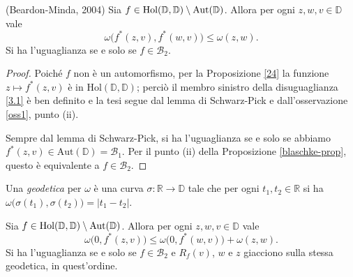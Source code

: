 \begin{thm} \label{31}
  (Beardon-Minda, 2004) Sia $f \in \text{\normalfont{Hol}}(\mathbb{D},\mathbb{D})\setminus\text{\normalfont{Aut}}(\mathbb{D})$. Allora per ogni $z, w, v \in \mathbb{D}$ vale
  \begin{equation} \label{3.1}
    \omega\bigl(f^*(z,v),f^*(w,v)\bigr) \le \omega(z,w).
  \end{equation}
  Si ha l'uguaglianza se e solo se $f \in \mathcal{B}_2$.
\end{thm}

\begin{proof}
  Poiché $f$ non è un automorfismo, per la Proposizione \ref{24} la funzione $z \longmapsto f^*(z,v)$ è in $\text{Hol}(\mathbb{D}, \mathbb{D})$; perciò il membro sinistro della disuguaglianza \eqref{3.1} è ben definito e la tesi segue dal lemma di Schwarz-Pick e dall'osservazione \ref{oss1}, punto (ii).

  Sempre dal lemma di Schwarz-Pick, si ha l'uguaglianza se e solo se abbiamo $f^*(z,v) \in \text{Aut}(\mathbb{D})=\mathcal{B}_1$. Per il punto (ii) della Proposizione \ref{blaschke-prop}, questo è equivalente a $f \in \mathcal{B}_2$.
\end{proof}

\begin{defn}
  Una \textit{geodetica} per $\omega$ è una curva $\sigma: \mathbb{R} \longrightarrow \mathbb{D}$ tale che per ogni $t_1,t_2 \in \mathbb{R}$ si ha $\omega\bigl(\sigma(t_1),\sigma(t_2)\bigr)=|t_1-t_2|$.
\end{defn}

\begin{cor} \label{32}
  Sia $f \in \text{\normalfont{Hol}}(\mathbb{D},\mathbb{D})\setminus\text{\normalfont{Aut}}(\mathbb{D})$. Allora per ogni $z, w, v \in \mathbb{D}$ vale
  \begin{equation}
    \omega\bigl(0, f^*(z,v)\bigr) \le \omega\bigl(0,f^*(w,v)\bigr)+\omega(z,w).
  \end{equation}
  Si ha l'uguaglianza se e solo se $f \in \mathcal{B}_2$ e $R_f(v)$, $w$ e $z$ giacciono sulla stessa geodetica, in quest'ordine.
\end{cor}

